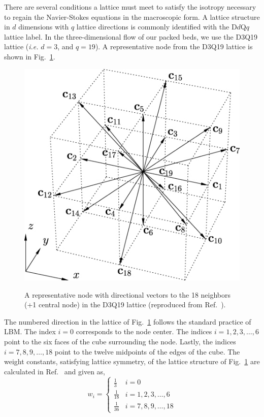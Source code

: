 There are several conditions a lattice must meet to satisfy the isotropy necessary to regain the Navier-Stokes equations in the macroscopic form.\cite{Viggen2009,Latt2007} A lattice structure in $d$ dimensions with $q$ lattice directions is commonly identified with the D$d$Q$q$ lattice label. In the three-dimensional flow of our packed beds, we use the D3Q19 lattice (\textit{i.e.} $d=3$, and $q=19$). A representative node from the D3Q19 lattice is shown in Fig.~\ref{fig:d3q19-lattice}.
\begin{figure}[t]
	\centering
	\caption{A representative node with directional vectors to the 18 neighbors (+1 central node) in the D3Q19 lattice (reproduced from Ref.~\cite{1742-5468-2010-01-P01018}).}
	\includegraphics[width=\singleimagewidth]{chapters/figures/lbm/4193301.jpg}\label{fig:d3q19-lattice}
\end{figure}

The numbered direction in the lattice of Fig.~\ref{fig:d3q19-lattice} follows the standard practice of LBM. The index $i=0$ corresponds to the node center. The indices $i = 1,2,3,\dots,6$ point to the six faces of the cube surrounding the node. Lastly, the indices $i=7,8,9,\dots,18$ point to the twelve midpoints of the edges of the cube. The weight constants, satisfying lattice symmetry, of the lattice structure of Fig.~\ref{fig:d3q19-lattice} are calculated in Ref.~\cite{Latt2007} and given as,
\begin{equation}\label{eq:d3q19-weights}
	w_i = \begin{cases}
	\frac{1}{3}			& i = 0\\
	\frac{1}{18} 		& i = 1,2,3,\dots,6\\
	\frac{1}{36}		& i = 7,8,9,\dots,18
	\end{cases}
\end{equation}

